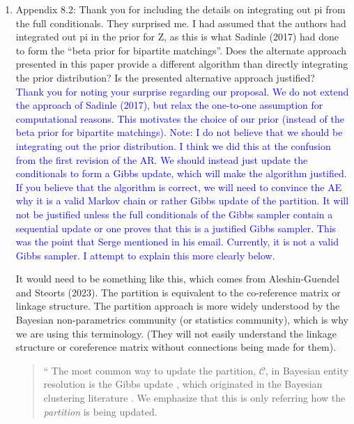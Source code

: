 \documentclass{article}
\newcommand{\C}{\mathcal{C}}
\begin{document}
\begin{enumerate}
    \item Appendix 8.2: Thank you for including the details on integrating out pi from the full
conditionals. They surprised me. I had assumed that the authors had integrated out pi in the
prior for Z, as this is what Sadinle (2017) had done to form the “beta prior for bipartite
matchings”. Does the alternate approach presented in this paper provide a different algorithm
than directly integrating the prior distribution? Is the presented alternative approach justified? \\
\textcolor{blue}{
Thank you for noting your surprise regarding our proposal. We do not extend the approach of Sadinle (2017), but relax the one-to-one assumption for computational reasons. This motivates the choice of our prior (instead of the beta prior for bipartite matchings). 
Note: I do not believe that we should be integrating out the prior distribution. I think we did this at the confusion from the first revision of the  AR. We should instead just update the conditionals to form a Gibbs update, which will make the algorithm justified. If you believe that the algorithm is correct, we will need to convince the AE why it is a valid Markov chain or rather Gibbs update of the partition. 
}
\textcolor{blue}{It will not be justified unless the full conditionals of the Gibbs sampler contain a sequential update or one proves that this is a justified Gibbs sampler. This was the point that Serge mentioned in his email. Currently, it is not a valid Gibbs sampler. I attempt to explain this more clearly below.}

It would need to be something like this, which comes from Aleshin-Guendel and Steorts (2023). The partition is equivalent to the co-reference matrix or linkage structure. The partition approach is more widely understood by the Bayesian non-parametrics community (or statistics community), which is why we are using this terminology. (They will not easily understand the linkage structure or coreference matrix without connections being made for them).

\begin{quote}
			`` The most common way to update the partition, $\C$, in Bayesian entity resolution is the Gibbs update \citep{Sadinle_2014, Steorts_2015, Sadinle_2017, Tancredi_2020, Marchant_2021, Aleshin-Guendel_2022, Marchant_2023}, which originated in the Bayesian clustering literature \citep[see e.g.][]{Neal_2000}.
			 We emphasize that this is only referring how the \textit{partition} is being updated. 
			 

\end{quote}
\end{enumerate}
\end{document}
